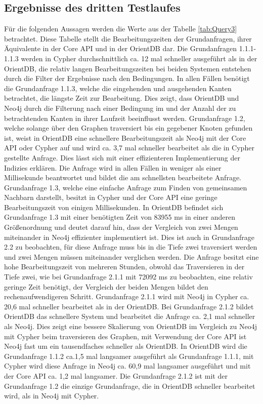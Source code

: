 \subsection{Ergebnisse des dritten Testlaufes}
Für die folgenden Aussagen werden die Werte aus der Tabelle \ref{tab:Query3}  betrachtet. Diese Tabelle stellt die Bearbeitungszeiten der Grundanfragen, ihrer Äquivalente in der Core API und in der OrientDB dar. \newline
Die Grundanfragen 1.1.1-1.1.3 werden in Cypher durchschnittlich ca. 12 mal schneller ausgeführt als in der OrientDB, die relativ langen Bearbeitungszeiten bei beiden Systemen entstehen durch die Filter der Ergebnisse nach den Bedingungen. In allen Fällen benötigt die Grundanfrage 1.1.3, welche die eingehenden und ausgehenden Kanten betrachtet, die längste Zeit zur Bearbeitung. Dies zeigt, dass OrientDB und Neo4j durch die Filterung nach einer Bedingung im und der Anzahl der zu betrachtenden Kanten in ihrer Laufzeit beeinflusst werden. \newline
 Grundanfrage 1.2, welche solange über den Graphen traversiert bis ein gegebener Knoten gefunden ist, weist in OrientDB eine schnellere Bearbeitungszeit als Neo4j mit der Core API oder Cypher auf und wird ca. 3,7 mal schneller bearbeitet als die in Cypher gestellte Anfrage. Dies lässt sich mit einer effizienteren Implementierung der Indizies erklären. Die Anfrage wird in allen Fällen in weniger als einer Millisekunde beantwortet und bildet die am schnellsten bearbeitete Anfrage. \newline
Grundanfrage 1.3, welche eine einfache Anfrage zum Finden von gemeinsamen Nachbarn darstellt, besitzt in Cypher und der Core API eine geringe Bearbeitungszeit von einigen Millisekunden. In OrientDB befindet sich Grundanfrage 1.3 mit einer benötigten Zeit von 83955 ms in einer anderen Größenordnung und deutet darauf hin, dass der Vergleich von zwei Mengen miteinander in Neo4j effizienter implementiert ist. Dies ist auch in Grundanfrage 2.2 zu beobachten, für diese Anfrage muss bis in die Tiefe zwei traversiert werden und zwei Mengen müssen miteinander verglichen werden. Die Anfrage besitzt eine hohe Bearbeitungszeit von mehreren Stunden, obwohl das Traversieren in der Tiefe zwei, wie bei Grundanfrage 2.1.1 mit 72092 ms zu beobachten, eine relativ geringe Zeit benötigt, der Vergleich der beiden Mengen bildet den rechenaufwendigeren Schritt. \newline
 Grundanfrage 2.1.1 wird mit Neo4j in Cypher ca. 20,6 mal schneller bearbeitet als in der OrientDB. Bei Grundanfrage 2.1.2 bildet OrientDB das schnellere System und bearbeitet die Anfrage ca. 2,1 mal schneller als Neo4j. Dies zeigt eine bessere Skalierung von OrientDB im Vergleich zu Neo4j mit Cypher beim traversieren des Graphen, mit Verwendung der Core API ist Neo4j fast um ein tausendfaches schneller als OrientDB. In OrientDB wird die Grundanfrage 1.1.2 ca.1,5 mal langsamer ausgeführt als Grundanfrage 1.1.1, mit Cypher wird diese Anfrage in Neo4j ca. 60,9 mal langsamer ausgeführt und mit der Core API ca. 1,2 mal langsamer. Die Grundanfrage 2.1.2 ist mit der Grundanfrage 1.2 die einzige Grundanfrage, die in OrientDB schneller bearbeitet wird, als in Neo4j mit Cypher. \newline  
